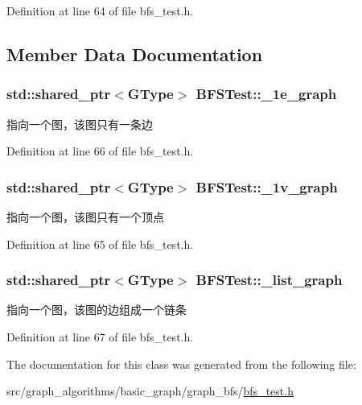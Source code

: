 Definition at line 64 of file bfs\+\_\+test.\+h.



\subsection{Member Data Documentation}
\hypertarget{class_b_f_s_test_a0158014634e67e6bee3f8f6b1e622ced}{}
\subsubsection[{\+\_\+1e\+\_\+graph}]{\setlength{\rightskip}{0pt plus 5cm}std\+::shared\+\_\+ptr$<${\bf G\+Type}$>$ B\+F\+S\+Test\+::\+\_\+1e\+\_\+graph\hspace{0.3cm}{\ttfamily [protected]}}\label{class_b_f_s_test_a0158014634e67e6bee3f8f6b1e622ced}
指向一个图，该图只有一条边 

Definition at line 66 of file bfs\+\_\+test.\+h.

\hypertarget{class_b_f_s_test_a0d7cdb7946902c8d93945a35a222b9d7}{}
\subsubsection[{\+\_\+1v\+\_\+graph}]{\setlength{\rightskip}{0pt plus 5cm}std\+::shared\+\_\+ptr$<${\bf G\+Type}$>$ B\+F\+S\+Test\+::\+\_\+1v\+\_\+graph\hspace{0.3cm}{\ttfamily [protected]}}\label{class_b_f_s_test_a0d7cdb7946902c8d93945a35a222b9d7}
指向一个图，该图只有一个顶点 

Definition at line 65 of file bfs\+\_\+test.\+h.

\hypertarget{class_b_f_s_test_aacf800be44976478c190b2acd338377f}{}
\subsubsection[{\+\_\+list\+\_\+graph}]{\setlength{\rightskip}{0pt plus 5cm}std\+::shared\+\_\+ptr$<${\bf G\+Type}$>$ B\+F\+S\+Test\+::\+\_\+list\+\_\+graph\hspace{0.3cm}{\ttfamily [protected]}}\label{class_b_f_s_test_aacf800be44976478c190b2acd338377f}
指向一个图，该图的边组成一个链条 

Definition at line 67 of file bfs\+\_\+test.\+h.



The documentation for this class was generated from the following file\+:\begin{DoxyCompactItemize}
\item 
src/graph\+\_\+algorithms/basic\+\_\+graph/graph\+\_\+bfs/\hyperlink{bfs__test_8h}{bfs\+\_\+test.\+h}\end{DoxyCompactItemize}
